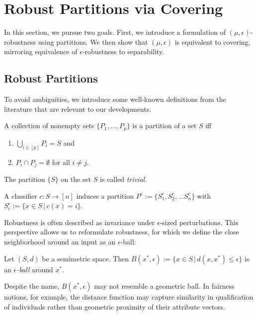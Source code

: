 \section{Robust Partitions via Covering}
\label{sec:partitions-covering}

In this section, we pursue two goals. First, we introduce a formulation of $(\mu,\epsilon)$-robustness using partitions. We then show that $(\mu,\epsilon)$ is equivalent to covering, mirroring equivalence of $\epsilon$-robustness to separability.

\subsection{Robust Partitions}

To avoid ambiguities, we introduce some well-known definitions from the literature that are relevant to our developments.
\begin{definition}[Partition]
\label{def:partition}
A collection of nonempty sets $\{P_1,\dots,P_p\}$ is a partition of a set $S$ iff
\begin{enumerate}
    \item $\bigcup_{i \in [p]} P_i = S$ and
    \item $P_i \cap P_j = \emptyset$ for all $i \neq j$.
\end{enumerate} 
The partition $\{S\}$ on the set $S$ is called \emph{trivial}.
\end{definition}
\begin{definition}
\label{def:induced-partition}
    A classifier $c: S \rightarrow [n]$ induces a partition $P^c := \{S^c_1, S^c_2, \dots S^c_n\}$ with $S^c_i := \{x \in S\,|\,c(x) = i\}$.
\end{definition}
Robustness is often described as invariance under $\epsilon$-sized perturbations. This perspective allows us to reformulate robustness, for which we define the close neighborhood around an input as an $\epsilon$-ball:
\begin{definition}
\label{def:epsilon-ball}
Let $(S, d)$ be a semimetric space. Then $B(x^*, \epsilon) := \{x \in S\,|\,d(x,x^*) \leq \epsilon\}$ is an \emph{$\epsilon$-ball} around $x^*$.
\end{definition}
Despite the name, $B(x^*, \epsilon)$ may not resemble a geometric ball. In fairness notions, for example, the distance function may capture similarity in qualification of individuals rather than geometric proximity of their attribute vectors.
